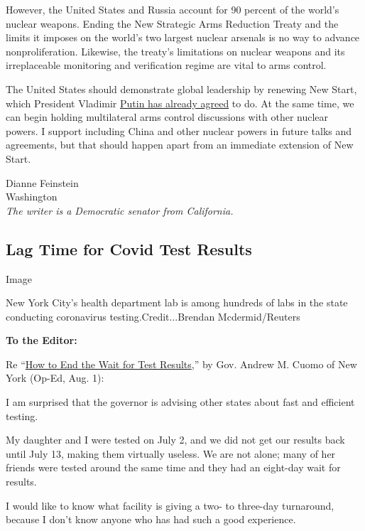 However, the United States and Russia account for 90 percent of the
world's nuclear weapons. Ending the New Strategic Arms Reduction Treaty
and the limits it imposes on the world's two largest nuclear arsenals is
no way to advance nonproliferation. Likewise, the treaty's limitations
on nuclear weapons and its irreplaceable monitoring and verification
regime are vital to arms control.

The United States should demonstrate global leadership by renewing New
Start, which President Vladimir
\href{https://www.armscontrol.org/blog/2019-12-19/us-russian-nuclear-arms-control}{Putin
has already agreed} to do. At the same time, we can begin holding
multilateral arms control discussions with other nuclear powers. I
support including China and other nuclear powers in future talks and
agreements, but that should happen apart from an immediate extension of
New Start.

Dianne Feinstein\\
Washington\\
\emph{The writer is a Democratic senator from California.}

\hypertarget{lag-time-for-covid-test-results}{%
\subsection{Lag Time for Covid Test
Results}\label{lag-time-for-covid-test-results}}

Image

New York City's health department lab is among hundreds of labs in the
state conducting coronavirus testing.Credit...Brendan Mcdermid/Reuters

\textbf{To the Editor:}

Re
``\href{https://www.nytimes.com/2020/07/31/opinion/coronavirus-testing-cuomo.html}{How
to End the Wait for Test Results},'' by Gov. Andrew M. Cuomo of New York
(Op-Ed, Aug. 1):

I am surprised that the governor is advising other states about fast and
efficient testing.

My daughter and I were tested on July 2, and we did not get our results
back until July 13, making them virtually useless. We are not alone;
many of her friends were tested around the same time and they had an
eight-day wait for results.

I would like to know what facility is giving a two- to three-day
turnaround, because I don't know anyone who has had such a good
experience.

